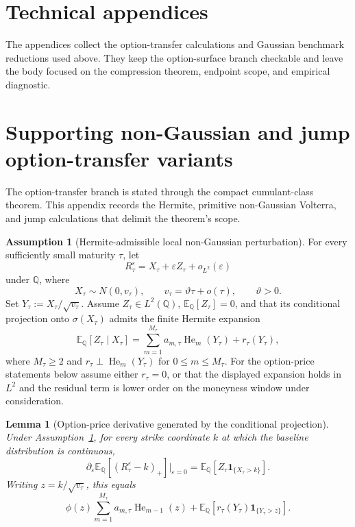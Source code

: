 \documentclass[11pt,a4paper]{amsart}
\theoremstyle{plain}
\newtheorem{lemma}[theorem]{Lemma}
\theoremstyle{definition}
\newtheorem{assumption}[theorem]{Assumption}
\theoremstyle{remark}
\DeclareMathOperator{\He}{He}
\newcommand{\QQ}{\mathbb{Q}}
\newcommand{\EE}{\mathbb{E}}
\newcommand{\one}{\mathbf{1}}
\begin{document}
\appendix

\section*{Technical appendices}
The appendices collect the option-transfer calculations and Gaussian benchmark reductions used
above.  They keep the option-surface branch checkable and leave the body focused on the compression
theorem, endpoint scope, and empirical diagnostic.



\section{Supporting non-Gaussian and jump option-transfer variants}
\label{sec:option-transfer-variants}

The option-transfer branch is stated through the compact cumulant-class theorem.  This appendix
records the Hermite, primitive non-Gaussian Volterra, and jump calculations that delimit the theorem's
scope.

\begin{assumption}[Hermite-admissible local non-Gaussian perturbation]\label{ass:hermite-admissible}
For every sufficiently small maturity \(\tau\), let
\[
        R_\tau^\varepsilon=X_\tau+\varepsilon Z_\tau+o_{L^2}(\varepsilon)
\]
under \(\QQ\), where
\[
        X_\tau\sim N(0,v_\tau),
        \qquad
        v_\tau=\vartheta\tau+o(\tau),
        \qquad
        \vartheta>0.
\]
Set \(Y_\tau:=X_\tau/\sqrt{v_\tau}\).  Assume \(Z_\tau\in L^2(\QQ)\),
\(\EE_\QQ[Z_\tau]=0\), and that its conditional projection onto \(\sigma(X_\tau)\) admits the
finite Hermite expansion
\[
        \EE_\QQ[Z_\tau\mid X_\tau]
        =
        \sum_{m=1}^{M_\tau} a_{m,\tau}\He_m(Y_\tau)+r_\tau(Y_\tau),
\]
where \(M_\tau\ge2\) and \(r_\tau\perp \He_m(Y_\tau)\) for \(0\le m\le M_\tau\).  For the
option-price statements below assume either \(r_\tau=0\), or that the displayed expansion holds in
\(L^2\) and the residual term is lower order on the moneyness window under consideration.
\end{assumption}

\begin{lemma}[Option-price derivative generated by the conditional projection]\label{lem:price-projection}
Under Assumption~\ref{ass:hermite-admissible}, for every strike coordinate \(k\) at which the
baseline distribution is continuous,
\[
        \partial_\varepsilon\EE_\QQ[(R_\tau^\varepsilon-k)_+]\big|_{\varepsilon=0}
        =
        \EE_\QQ[Z_\tau\one_{\{X_\tau>k\}}].
\]
Writing \(z=k/\sqrt{v_\tau}\), this equals
\[
        \phi(z)
        \sum_{m=1}^{M_\tau}a_{m,\tau}\He_{m-1}(z)
        +
        \EE_\QQ[r_\tau(Y_\tau)\one_{\{Y_\tau>z\}}].
\]
\end{lemma}
\end{document}
